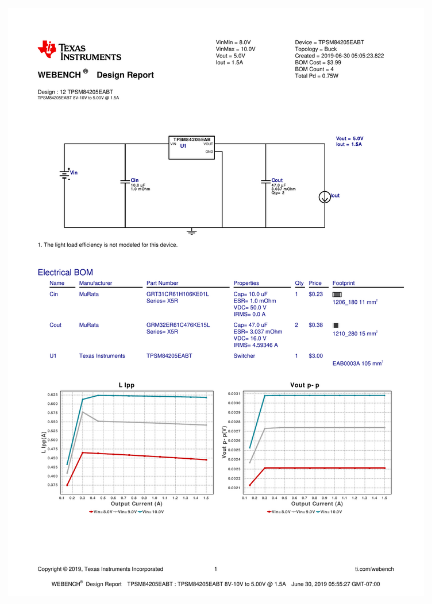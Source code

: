 \documentclass[a4paper, 11pt]{article} %
\begin{document}
\begin{figure}[H]
    \centering
    \includegraphics[width = 0.98\textwidth]{wb_report_cover.pdf}
\end{figure}


\end{document}
